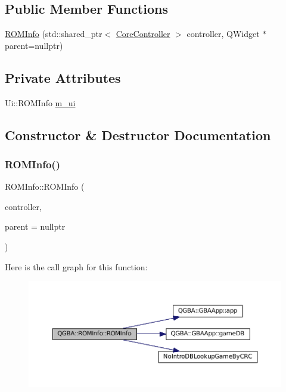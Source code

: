 \subsection*{Public Member Functions}
\begin{DoxyCompactItemize}
\item 
\mbox{\hyperlink{class_q_g_b_a_1_1_r_o_m_info_ae233dad8f572b543c14f3e9702728d4b}{R\+O\+M\+Info}} (std\+::shared\+\_\+ptr$<$ \mbox{\hyperlink{class_q_g_b_a_1_1_core_controller}{Core\+Controller}} $>$ controller, Q\+Widget $\ast$parent=nullptr)
\end{DoxyCompactItemize}
\subsection*{Private Attributes}
\begin{DoxyCompactItemize}
\item 
Ui\+::\+R\+O\+M\+Info \mbox{\hyperlink{class_q_g_b_a_1_1_r_o_m_info_abe36da4ac8f24ab6ea087abd659280dc}{m\+\_\+ui}}
\end{DoxyCompactItemize}


\subsection{Constructor \& Destructor Documentation}
\mbox{\label{class_q_g_b_a_1_1_r_o_m_info_ae233dad8f572b543c14f3e9702728d4b}} 
\subsubsection{\texorpdfstring{R\+O\+M\+Info()}{ROMInfo()}}
{\footnotesize\ttfamily R\+O\+M\+Info\+::\+R\+O\+M\+Info (\begin{DoxyParamCaption}\item[{std\+::shared\+\_\+ptr$<$ \mbox{\hyperlink{class_q_g_b_a_1_1_core_controller}{Core\+Controller}} $>$}]{controller,  }\item[{Q\+Widget $\ast$}]{parent = {\ttfamily nullptr} }\end{DoxyParamCaption})}

Here is the call graph for this function\+:
\nopagebreak
\begin{figure}[H]
\begin{center}
\leavevmode
\includegraphics[width=350pt]{class_q_g_b_a_1_1_r_o_m_info_ae233dad8f572b543c14f3e9702728d4b_cgraph}
\end{center}
\end{figure}


